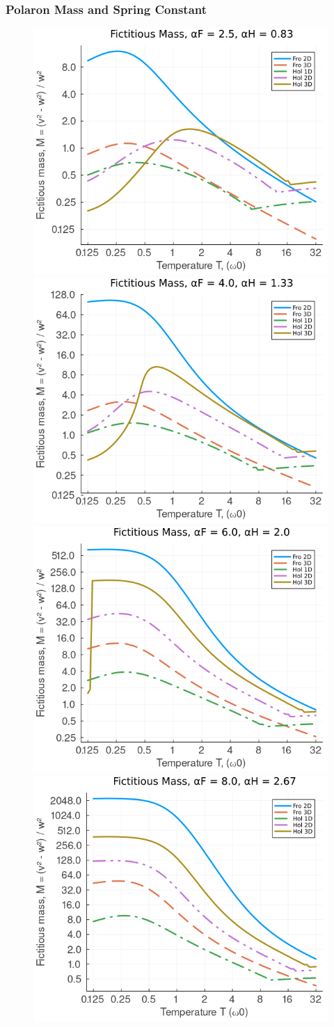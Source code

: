 \subsubsection{Polaron Mass and Spring Constant}

\begin{figure}[!tbp]
    \includegraphics[width=.49\textwidth]{figures/mass_temp_25_083.png}
    \includegraphics[width=.49\textwidth]{figures/mass_temp_4_133.png}
    \includegraphics[width=.49\textwidth]{figures/mass_temp_6_2.png}
    \includegraphics[width=.49\textwidth]{figures/mass_temp_8_267.png}

\end{figure}
